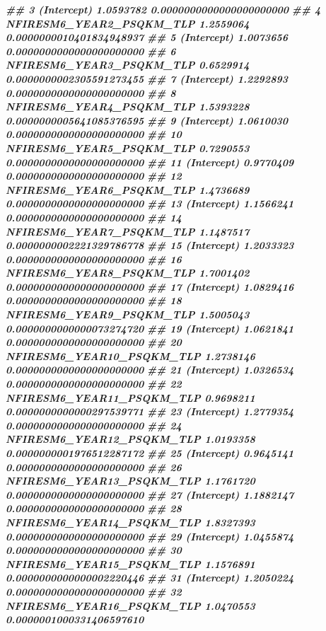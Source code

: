 \documentclass[10pt,landscape,a3paper]{article}
\newenvironment{Shaded}{\begin{snugshade}}{\end{snugshade}}
\newcommand{\DocumentationTok}[1]{\textcolor[rgb]{0.56,0.35,0.01}{\textbf{\textit{#1}}}}
\begin{document}
\begin{Shaded}
\begin{Highlighting}[]
\DocumentationTok{\#\# 3                (Intercept) 1.0593782 0.0000000000000000000000}
\DocumentationTok{\#\# 4   NFIRESM6\_YEAR2\_PSQKM\_TLP 1.2559064 0.0000000010401834948937}
\DocumentationTok{\#\# 5                (Intercept) 1.0073656 0.0000000000000000000000}
\DocumentationTok{\#\# 6   NFIRESM6\_YEAR3\_PSQKM\_TLP 0.6529914 0.0000000002305591273455}
\DocumentationTok{\#\# 7                (Intercept) 1.2292893 0.0000000000000000000000}
\DocumentationTok{\#\# 8   NFIRESM6\_YEAR4\_PSQKM\_TLP 1.5393228 0.0000000005641085376595}
\DocumentationTok{\#\# 9                (Intercept) 1.0610030 0.0000000000000000000000}
\DocumentationTok{\#\# 10  NFIRESM6\_YEAR5\_PSQKM\_TLP 0.7290553 0.0000000000000000000000}
\DocumentationTok{\#\# 11               (Intercept) 0.9770409 0.0000000000000000000000}
\DocumentationTok{\#\# 12  NFIRESM6\_YEAR6\_PSQKM\_TLP 1.4736689 0.0000000000000000000000}
\DocumentationTok{\#\# 13               (Intercept) 1.1566241 0.0000000000000000000000}
\DocumentationTok{\#\# 14  NFIRESM6\_YEAR7\_PSQKM\_TLP 1.1487517 0.0000000002221329786778}
\DocumentationTok{\#\# 15               (Intercept) 1.2033323 0.0000000000000000000000}
\DocumentationTok{\#\# 16  NFIRESM6\_YEAR8\_PSQKM\_TLP 1.7001402 0.0000000000000000000000}
\DocumentationTok{\#\# 17               (Intercept) 1.0829416 0.0000000000000000000000}
\DocumentationTok{\#\# 18  NFIRESM6\_YEAR9\_PSQKM\_TLP 1.5005043 0.0000000000000073274720}
\DocumentationTok{\#\# 19               (Intercept) 1.0621841 0.0000000000000000000000}
\DocumentationTok{\#\# 20 NFIRESM6\_YEAR10\_PSQKM\_TLP 1.2738146 0.0000000000000000000000}
\DocumentationTok{\#\# 21               (Intercept) 1.0326534 0.0000000000000000000000}
\DocumentationTok{\#\# 22 NFIRESM6\_YEAR11\_PSQKM\_TLP 0.9698211 0.0000000000000297539771}
\DocumentationTok{\#\# 23               (Intercept) 1.2779354 0.0000000000000000000000}
\DocumentationTok{\#\# 24 NFIRESM6\_YEAR12\_PSQKM\_TLP 1.0193358 0.0000000001976512287172}
\DocumentationTok{\#\# 25               (Intercept) 0.9645141 0.0000000000000000000000}
\DocumentationTok{\#\# 26 NFIRESM6\_YEAR13\_PSQKM\_TLP 1.1761720 0.0000000000000000000000}
\DocumentationTok{\#\# 27               (Intercept) 1.1882147 0.0000000000000000000000}
\DocumentationTok{\#\# 28 NFIRESM6\_YEAR14\_PSQKM\_TLP 1.8327393 0.0000000000000000000000}
\DocumentationTok{\#\# 29               (Intercept) 1.0455874 0.0000000000000000000000}
\DocumentationTok{\#\# 30 NFIRESM6\_YEAR15\_PSQKM\_TLP 1.1576891 0.0000000000000002220446}
\DocumentationTok{\#\# 31               (Intercept) 1.2050224 0.0000000000000000000000}
\DocumentationTok{\#\# 32 NFIRESM6\_YEAR16\_PSQKM\_TLP 1.0470553 0.0000001000331406597610}

\end{Highlighting}
\end{Shaded}
\end{document}
